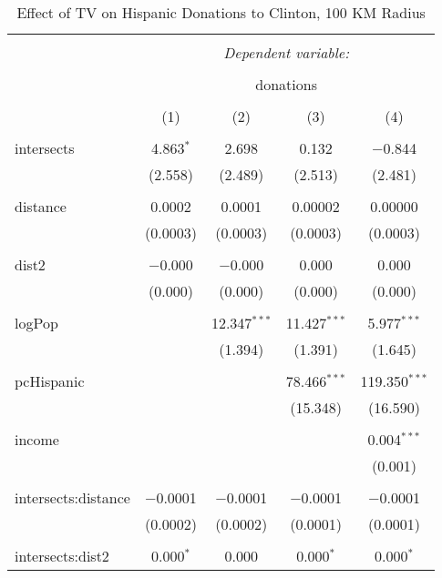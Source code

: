 
\begin{table}[!htbp] \centering 
  \caption{Effect of TV on Hispanic Donations to Clinton, 100 KM Radius} 
  \label{} 
\begin{tabular}{@{\extracolsep{-5pt}}lcccc} 
\\[-1.8ex]\hline 
\hline \\[-1.8ex] 
 & \multicolumn{4}{c}{\textit{Dependent variable:}} \\ 
\cline{2-5} 
\\[-1.8ex] & \multicolumn{4}{c}{donations} \\ 
\\[-1.8ex] & (1) & (2) & (3) & (4)\\ 
\hline \\[-1.8ex] 
 intersects & 4.863$^{*}$ & 2.698 & 0.132 & $-$0.844 \\ 
  & (2.558) & (2.489) & (2.513) & (2.481) \\ 
  & & & & \\ 
 distance & 0.0002 & 0.0001 & 0.00002 & 0.00000 \\ 
  & (0.0003) & (0.0003) & (0.0003) & (0.0003) \\ 
  & & & & \\ 
 dist2 & $-$0.000 & $-$0.000 & 0.000 & 0.000 \\ 
  & (0.000) & (0.000) & (0.000) & (0.000) \\ 
  & & & & \\ 
 logPop &  & 12.347$^{***}$ & 11.427$^{***}$ & 5.977$^{***}$ \\ 
  &  & (1.394) & (1.391) & (1.645) \\ 
  & & & & \\ 
 pcHispanic &  &  & 78.466$^{***}$ & 119.350$^{***}$ \\ 
  &  &  & (15.348) & (16.590) \\ 
  & & & & \\ 
 income &  &  &  & 0.004$^{***}$ \\ 
  &  &  &  & (0.001) \\ 
  & & & & \\ 
 intersects:distance & $-$0.0001 & $-$0.0001 & $-$0.0001 & $-$0.0001 \\ 
  & (0.0002) & (0.0002) & (0.0001) & (0.0001) \\ 
  & & & & \\ 
 intersects:dist2 & 0.000$^{*}$ & 0.000 & 0.000$^{*}$ & 0.000$^{*}$ \\ 

\end{tabular}
\end{table}
